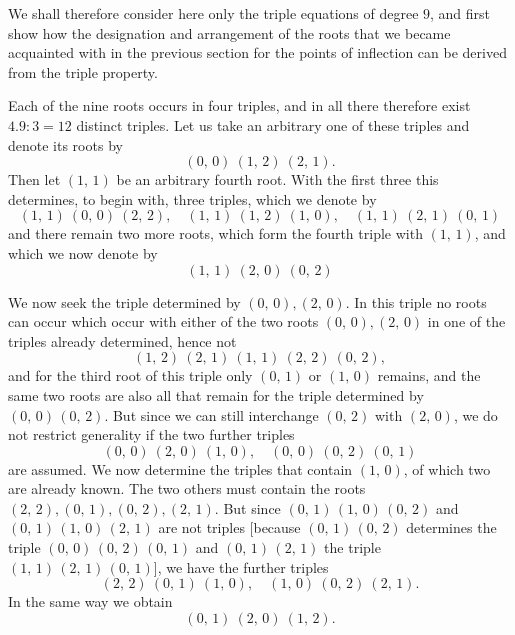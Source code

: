 
We shall therefore consider here only the triple equations of degree $9$,
and first show how the designation and arrangement of the roots
that we became acquainted with in the previous section for the
points of inflection can be derived from the triple property.

Each of the nine roots occurs in four triples, and in all there
therefore exist $4.9:3=12$ distinct triples. Let us take an
arbitrary one of these triples and denote its
roots by
\[
(0,\,0)\ (1,\,2)\ (2,\,1).
\]
Then let $(1,\,1)$ be an arbitrary fourth root. With the first
three this determines, to begin with, three triples, which we denote by
\[
(1,\,1)\ (0,\,0)\ (2,\,2), \quad (1,\,1)\ (1,\,2)\ (1,\,0), \quad (1,\,1)\ (2,\,1)\ (0,\,1)
\]
and there remain two more roots, which form the
fourth triple with $(1,\,1)$, and which we now denote by
\[
(1,\,1)\ (2,\,0)\ (0,\,2)
\]

We now seek the triple determined by $(0,\,0), (2,\,0)$.
In this triple no roots can occur which occur with either of the
two roots $(0,\,0), (2,\,0)$ in one of the triples already determined, %
hence not
\[
(1,\,2)\ (2,\,1)\ (1,\,1)\ (2,\,2)\ (0,\,2),
\]
and for the third root of this triple only $(0,\,1)$
or $(1,\,0)$ remains, and the same two roots are also all that remain
for the triple determined by $(0,\,0)\,(0,\,2)$. But since we can
still interchange $(0,\,2)$ with $(2,\,0)$, we do not restrict
generality if the two further triples
\[
(0,\,0)\ (2,\,0)\ (1,\,0), \quad (0,\,0)\ (0,\,2)\ (0,\,1)
\]
are assumed. We now determine the triples that contain $(1,\,0)$,
of which two are already known. The two others
must contain the roots $(2,\,2), (0,\,1), (0,\,2), (2,\,1)$. But since
$(0,\,1)\,(1,\,0)\,(0,\,2)$ and $(0,\,1)\,(1,\,0)\,(2,\,1)$ are not triples [because
$(0,\,1)\,(0,\,2)$ determines the triple $(0,\,0)\,(0,\,2)\,(0,\,1)$ and $(0,\,1)\,(2,\,1)$ the
triple $(1,\,1)\,(2,\,1)\,(0,\,1)$], we have the further
triples
\[
(2,\,2)\ (0,\,1)\ (1,\,0), \quad (1,\,0)\ (0,\,2)\ (2,\,1).
\]
In the same way we obtain
\[
(0,\,1)\ (2,\,0)\ (1,\,2).
\]
